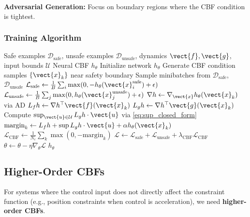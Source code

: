 \textbf{Adversarial Generation:} Focus on boundary regions where the CBF condition is tightest.

\subsubsection{Training Algorithm}

\begin{algorithm}[H]
\caption{Neural Control Barrier Function Learning}
\label{alg:neural_cbf}
\begin{algorithmic}[1]
\REQUIRE Safe examples $\mathcal{D}_{\text{safe}}$, unsafe examples $\mathcal{D}_{\text{unsafe}}$, dynamics $\vect{f}, \vect{g}$, input bounds $\mathcal{U}$
\ENSURE Neural CBF $h_\theta$
\STATE Initialize network $h_\theta$
\STATE Generate CBF condition samples $\{\vect{x}_k\}$ near safety boundary
\STATE
{}
    \STATE Sample minibatches from $\mathcal{D}_{\text{safe}}$, $\mathcal{D}_{\text{unsafe}}$
    \STATE
    \STATE {}
    \STATE $\mathcal{L}_{\text{safe}} \gets \frac{1}{B}\sum_i \max(0, -h_\theta(\vect{x}_i^{\text{safe}}) + \epsilon)$
    \STATE $\mathcal{L}_{\text{unsafe}} \gets \frac{1}{B}\sum_j \max(0, h_\theta(\vect{x}_j^{\text{unsafe}}) + \epsilon)$
    \STATE
    \STATE {}
        \STATE $\nabla h \gets \nabla_{\vect{x}} h_\theta(\vect{x}_k)$ via AD
        \STATE $L_f h \gets \nabla h^\top \vect{f}(\vect{x}_k)$
        \STATE $L_g h \gets \nabla h^\top \vect{g}(\vect{x}_k)$
        \STATE Compute $\sup_{\vect{u} \in \mathcal{U}} L_g h \cdot \vect{u}$ via \eqref{eq:sup_closed_form}
        \STATE $\text{margin}_k \gets L_f h + \sup L_g h \cdot \vect{u} + \alpha h_\theta(\vect{x}_k)$
    \ENDFOR
    \STATE $\mathcal{L}_{\text{CBF}} \gets \frac{1}{N_c}\sum_k \max(0, -\text{margin}_k)$
    \STATE
    \STATE $\mathcal{L} \gets \mathcal{L}_{\text{safe}} + \mathcal{L}_{\text{unsafe}} + \lambda_{\text{CBF}} \mathcal{L}_{\text{CBF}}$
    \STATE $\theta \gets \theta - \eta \nabla_\theta \mathcal{L}$
\ENDFOR
\RETURN $h_\theta$
\end{algorithmic}
\end{algorithm}

\subsection{Higher-Order CBFs}

For systems where the control input does not directly affect the constraint function (e.g., position constraints when control is acceleration), we need \textbf{higher-order CBFs}.

